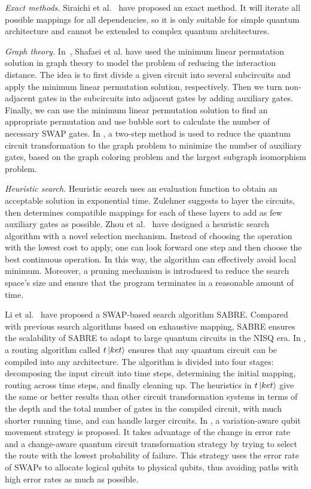 \documentclass[runningheads]{llncs}
\begin{document}
\emph{Exact methods.}
Siraichi et al.~\cite{2018QubitSiraichi} have proposed an exact method. It will iterate all possible mappings for all dependencies, so it is only suitable for simple quantum architecture and cannot be extended to complex quantum architectures.

\emph{Graph theory.} 
In~\cite{Shafaei2013}, Shafaei et al. have used the minimum linear permutation solution in graph theory to model the problem of reducing the interaction distance. The idea is to first divide a given circuit into several subcircuits and apply the minimum linear permutation solution, respectively. Then we turn non-adjacent gates in the subcircuits into adjacent gates by adding auxiliary gates. Finally, we can use the minimum linear permutation solution to find an appropriate permutation and use bubble sort to calculate the number of necessary SWAP gates. In \cite{Guerreschi2018,Matsuo2019}, a two-step method is used to reduce the quantum circuit transformation to the graph problem to minimize the number of auxiliary gates, based on the graph coloring problem and the largest subgraph isomorphism problem.

\emph{Heuristic search.}
Heuristic search uses an evaluation function to obtain an acceptable solution in exponential time. Zulehner \cite{Zulehner2017} suggests to layer the circuits, then determines compatible mappings for each of these layers to add as few auxiliary gates as possible. Zhou et al.~\cite{Xiangzhen2020} have designed a heuristic search algorithm with a novel selection mechanism. Instead of choosing the operation with the lowest cost to apply, one can look forward one step and then choose the best continuous operation. In this way, the algorithm can effectively avoid local minimum. Moreover, a pruning mechanism is introduced to reduce the search space's size and ensure that the program terminates in a reasonable amount of time.

Li et al.~\cite{Li2018} have proposed a SWAP-based search algorithm SABRE. Compared with previous search algorithms based on exhaustive mapping, SABRE
ensures the scalability of SABRE to adapt to large quantum circuits in the NISQ era. In \cite{Cowtan2019}, a routing algorithm called $t\left\vert{ket}\right\rangle$  ensures that any quantum circuit can be compiled into any architecture. The algorithm is divided into four stages: decomposing the input circuit into time steps, determining the initial mapping, routing across time steps, and finally cleaning up. The heuristics in $t\left\vert{ket}\right\rangle$ give the same or better results than other circuit transformation systems in terms of the depth and the total number of gates in the compiled circuit, with much shorter running time, and can handle larger circuits. In \cite{Tannu2019},  a variation-aware qubit movement strategy is proposed. It takes advantage of the change in error rate and a change-aware quantum circuit transformation strategy by trying to select the route with the lowest probability of failure. This strategy uses the error rate of  SWAPs to allocate logical qubits to physical qubits, thus avoiding paths with high error rates as much as possible.
\end{document}
